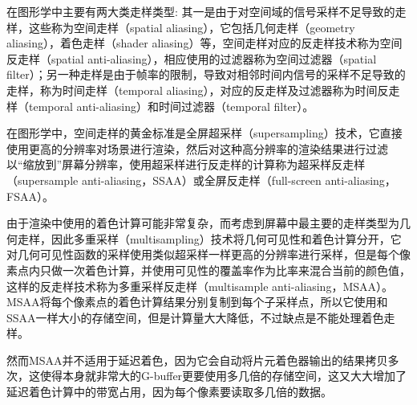 在图形学中主要有两大类走样类型: 其一是由于对空间域的信号采样不足导致的走样，这些称为空间走样（spatial aliasing），它包括几何走样（geometry aliasing），着色走样（shader aliasing）等，空间走样对应的反走样技术称为空间反走样（spatial anti-aliasing），相应使用的过滤器称为空间过滤器（spatial filter）；另一种走样是由于帧率的限制，导致对相邻时间内信号的采样不足导致的走样，称为时间走样（temporal aliasing），对应的反走样及过滤器称为时间反走样（temporal anti-aliasing）和时间过滤器（temporal filter）。

在图形学中，空间走样的黄金标准是全屏超采样（supersampling）技术，它直接使用更高的分辨率对场景进行渲染，然后对这种高分辨率的渲染结果进行过滤以“缩放到”屏幕分辨率，使用超采样进行反走样的计算称为超采样反走样（supersample anti-aliasing，SSAA）或全屏反走样（full-screen anti-aliasing，FSAA）。

由于渲染中使用的着色计算可能非常复杂，而考虑到屏幕中最主要的走样类型为几何走样，因此多重采样（multisampling）技术将几何可见性和着色计算分开，它对几何可见性函数的采样使用类似超采样一样更高的分辨率进行采样，但是每个像素点内只做一次着色计算，并使用可见性的覆盖率作为比率来混合当前的颜色值，这样的反走样技术称为多重采样反走样（multisample anti-aliasing，MSAA）。MSAA将每个像素点的着色计算结果分别复制到每个子采样点，所以它使用和SSAA一样大小的存储空间，但是计算量大大降低，不过缺点是不能处理着色走样。

然而MSAA并不适用于延迟着色，因为它会自动将片元着色器输出的结果拷贝多次，这使得本身就非常大的G-buffer更要使用多几倍的存储空间，这又大大增加了延迟着色计算中的带宽占用，因为每个像素要读取多几倍的数据。


